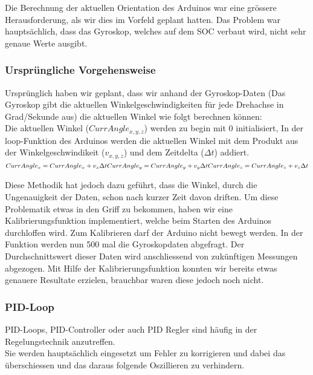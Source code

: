 
Die Berechnung der aktuellen Orientation des Arduinos war eine grössere Herausforderung,
als wir dies im Vorfeld geplant hatten. Das Problem war hauptsächlich, dass das Gyroskop, welches auf dem SOC verbaut wird, nicht sehr genaue Werte ausgibt.

\subsubsection{Ursprüngliche Vorgehensweise}
Ursprünglich haben wir geplant, dass wir anhand der Gyroskop-Daten 
(Das Gyroskop gibt die aktuellen Winkelgeschwindigkeiten für jede Drehachse in Grad/Sekunde aus) 
die aktuellen Winkel wie folgt berechnen können:\\

Die aktuellen Winkel (\begin{math}CurrAngle_{x,y,z}\end{math}) werden zu begin mit 0 initialisiert, In der loop-Funktion des Arduinos werden die aktuellen Winkel mit dem Produkt aus der Winkelgeschwindikeit (\begin{math}v_{x,y,z}\end{math}) und dem Zeitdelta (\begin{math}\Delta{t}\end{math}) addiert.\\

\begin{math}
  CurrAngle_x = CurrAngle_x + v_x \Delta t  \\
  CurrAngle_y = CurrAngle_y + v_y \Delta t  \\
  CurrAngle_z = CurrAngle_z + v_z \Delta t  \\
\end{math}

Diese Methodik hat jedoch dazu geführt, dass die Winkel, durch die Ungenauigkeit der Daten, schon nach kurzer Zeit davon driften.
Um diese Problematik etwas in den Griff zu bekommen, haben wir eine Kalibrierungsfunktion implementiert, welche beim Starten des Arduinos durchloffen wird.
Zum Kalibrieren darf der Arduino nicht bewegt werden. In der Funktion werden nun 500 mal die Gyroskopdaten abgefragt.
Der Durchschnittswert dieser Daten wird anschliessend von zukünftigen Messungen abgezogen.
Mit Hilfe der Kalibrierungsfunktion konnten wir bereits etwas genauere Resultate erzielen, brauchbar waren diese jedoch  noch nicht.



\subsubsection{PID-Loop}
PID-Loops, PID-Controller oder auch PID Regler sind häufig in der Regelungstechnik anzutreffen.\\
Sie werden hauptsächlich eingesetzt um Fehler zu korrigieren und dabei das überschiessen und das daraus folgende Oszillieren zu verhindern.\\

